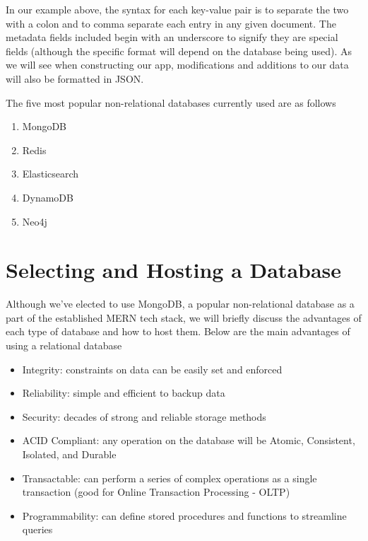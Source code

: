 In our example above, the syntax for each key-value pair is to separate the two with a colon and to comma separate each entry in any given document. The metadata fields included begin with an underscore to signify they are special fields (although the specific format will depend on the database being used). As we will see when constructing our app, modifications and additions to our data will also be formatted in JSON.

The five most popular non-relational databases currently used are as follows

\begin{enumerate}
    \item MongoDB
    \item Redis 
    \item Elasticsearch
    \item DynamoDB
    \item Neo4j
\end{enumerate}

\section{Selecting and Hosting a Database}

Although we've elected to use MongoDB, a popular non-relational database as a part of the established MERN tech stack, we will briefly discuss the advantages of each type of database and how to host them. Below are the main advantages of using a relational database

\begin{itemize}
    \item Integrity: constraints on data can be easily set and enforced
    \item Reliability: simple and efficient to backup data
    \item Security: decades of strong and reliable storage methods
    \item ACID Compliant: any operation on the database will be Atomic, Consistent, Isolated, and Durable
    \item Transactable: can perform a series of complex operations as a single transaction (good for Online Transaction Processing  - OLTP)
    \item Programmability: can define stored procedures and functions to streamline queries 
\end{itemize}

